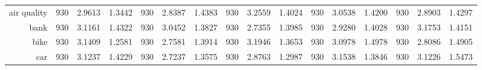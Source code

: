 \begin{table}[H]
{\begin{tabular}{rccccccccccccccc}
			air quality                         & 930                                     & 2.9613                                                                    & 1.3442          & 930                            & \cellcolor[rgb]{ .776,  .937,  .808}\textcolor[rgb]{ 0,  .38,  0}{2.8387} & 1.4383          & 930                             & 3.2559                                                                             & 1.4024          & 930                             & 3.0538                                                                    & 1.4200          & 930                             & 2.8903                                                                    & 1.4297          \\
			bank                                & 930                                     & 3.1161                                                                    & 1.4322          & 930                            & 3.0452                                                                    & 1.3827          & 930                             & \cellcolor[rgb]{ .776,  .937,  .808}\textcolor[rgb]{ 0,  .38,  0}{2.7355}          & 1.3985          & 930                             & 2.9280                                                                    & 1.4028          & 930                             & 3.1753                                                                    & 1.4151          \\
			bike                                & 930                                     & 3.1409                                                                    & 1.2581          & 930                            & \cellcolor[rgb]{ .776,  .937,  .808}\textcolor[rgb]{ 0,  .38,  0}{2.7581} & 1.3914          & 930                             & 3.1946                                                                             & 1.3653          & 930                             & 3.0978                                                                    & 1.4978          & 930                             & 2.8086                                                                    & 1.4905          \\
			car                                 & 930                                     & 3.1237                                                                    & 1.4229          & 930                            & \cellcolor[rgb]{ .776,  .937,  .808}\textcolor[rgb]{ 0,  .38,  0}{2.7237} & 1.3575          & 930                             & 2.8763                                                                             & 1.2987          & 930                             & 3.1538                                                                    & 1.3846          & 930                             & 3.1226                                                                    & 1.5473          \\

\end{tabular}}
\end{table}

